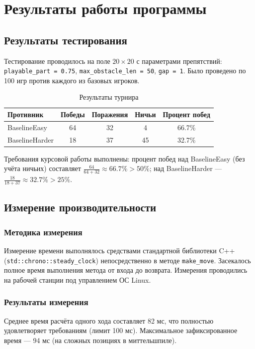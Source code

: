 \documentclass[a4paper,14pt]{extreport}
\begin{document}
\chapter{Результаты работы программы}
\section{Результаты тестирования}
Тестирование проводилось на поле $20 \times 20$ с параметрами препятствий: \texttt{playable\_part = 0.75}, \texttt{max\_obstacle\_len = 50}, \texttt{gap = 1}. Было проведено по 100 игр против каждого из базовых игроков.

\begin{table}[H]
\centering
\caption{Результаты турнира}
\begin{tabularx}{\linewidth}{@{} lcccc @{}}
\toprule
Противник & Победы & Поражения & Ничьи & Процент побед \\
\midrule
BaselineEasy   & 64 & 32 & 4  & 66.7\% \\
BaselineHarder & 18 & 37 & 45 & 32.7\% \\
\bottomrule
\end{tabularx}
\end{table}

Требования курсовой работы выполнены: процент побед над BaselineEasy (без учёта ничьих) составляет $\frac{64}{64+32} \approx 66.7\% > 50\%$; над BaselineHarder — $\frac{18}{18+37} \approx 32.7\% > 25\%$.

\section{Измерение производительности}
\subsection{Методика измерения}
Измерение времени выполнялось средствами стандартной библиотеки C++ (\texttt{std::chrono::steady\_clock}) непосредственно в методе \texttt{make\_move}. Засекалось полное время выполнения метода от входа до возврата. Измерения проводились на рабочей станции под управлением ОС Linux.

\subsection{Результаты измерения}
Среднее время расчёта одного хода составляет 82 мс, что полностью удовлетворяет требованиям (лимит 100 мс). Максимальное зафиксированное время — 94 мс (на сложных позициях в миттельшпиле).
\end{document}
